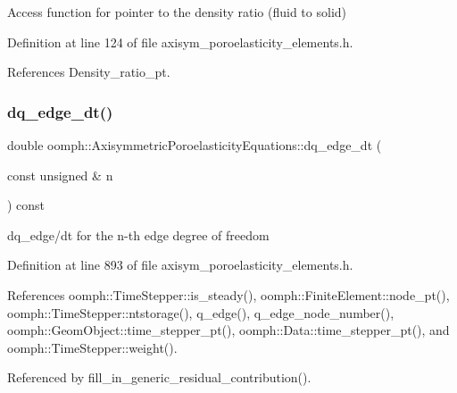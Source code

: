 Access function for pointer to the density ratio (fluid to solid) 



Definition at line 124 of file axisym\+\_\+poroelasticity\+\_\+elements.\+h.



References Density\+\_\+ratio\+\_\+pt.

\mbox{\label{classoomph_1_1AxisymmetricPoroelasticityEquations_aed0d46b9eea284a67bc3cc09571699a5}} 
\subsubsection{\texorpdfstring{dq\+\_\+edge\+\_\+dt()}{dq\_edge\_dt()}}
{\footnotesize\ttfamily double oomph\+::\+Axisymmetric\+Poroelasticity\+Equations\+::dq\+\_\+edge\+\_\+dt (\begin{DoxyParamCaption}\item[{const unsigned \&}]{n }\end{DoxyParamCaption}) const\hspace{0.3cm}{\ttfamily [inline]}}



dq\+\_\+edge/dt for the n-\/th edge degree of freedom 



Definition at line 893 of file axisym\+\_\+poroelasticity\+\_\+elements.\+h.



References oomph\+::\+Time\+Stepper\+::is\+\_\+steady(), oomph\+::\+Finite\+Element\+::node\+\_\+pt(), oomph\+::\+Time\+Stepper\+::ntstorage(), q\+\_\+edge(), q\+\_\+edge\+\_\+node\+\_\+number(), oomph\+::\+Geom\+Object\+::time\+\_\+stepper\+\_\+pt(), oomph\+::\+Data\+::time\+\_\+stepper\+\_\+pt(), and oomph\+::\+Time\+Stepper\+::weight().



Referenced by fill\+\_\+in\+\_\+generic\+\_\+residual\+\_\+contribution().

\mbox{\label{classoomph_1_1AxisymmetricPoroelasticityEquations_a18c5fd291de25073cbef16ee6d0a4711}} 
